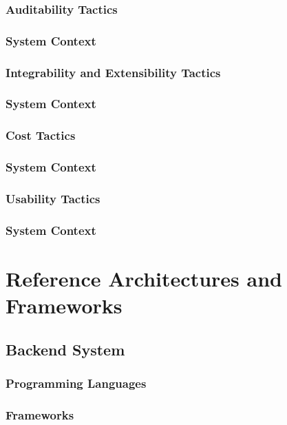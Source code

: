\documentclass[11pt,fleqn]{book} %
\begin{document}
\subsection{Auditability Tactics}
	\subsection{System Context}
\subsection{Integrability and Extensibility Tactics}
	\subsection{System Context}
\subsection{Cost Tactics}
	\subsection{System Context}
\subsection{Usability Tactics}
	\subsection{System Context}
	


\chapter{Reference Architectures and Frameworks}
	
	\section{Backend System}
		\subsection{Programming Languages}
		\subsection{Frameworks}
\end{document}
